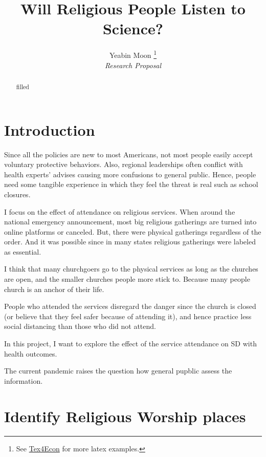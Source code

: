 \documentclass[12pt,english]{article}
\begin{document}
	
	\title{Will Religious People Listen to Science?}
	
	\author{Yeabin Moon \thanks{See \href{https://fanwangecon.github.io/Tex4Econ/}{Tex4Econ} for more latex examples.} \\ \textit{Research Proposal}}
	
	
	\maketitle
	\begin{abstract}
		\singlespacing filled\end{abstract}
	\vfill
	\pagebreak{}
	
	\section{Introduction}
	
	Since all the policies are new to most Americans, not most people easily accept voluntary protective behaviors. Also, regional leaderships often conflict with health experts' advises causing more confusions to general public. Hence, people need some tangible experience in which they feel the threat is real such as school closures. 
	
	I focus on the effect of attendance on religious services. When around the national emergency announcement, most big religious gatherings are turned into online platforms or canceled. But, there were physical gatherings regardless of the order. And it was possible since in many states religious gatherings were labeled as essential. 
	
	I think that many churchgoers go to the physical services as long as the churches are open, and the smaller churches people more stick to. Because many people church is an anchor of their life.
	
	People who attended the services disregard the danger since the church is closed (or believe that they feel safer because of attending it), and hence practice less social distancing than those who did not attend.
	
	In this project, I want to explore the effect of the service attendance on SD with health outcomes.
	
	The current pandemic raises the question how general pupblic assess the information.
	
	\pagebreak
	\appendix
	
	\section{Identify Religious Worship places} 
	
\end{document}
